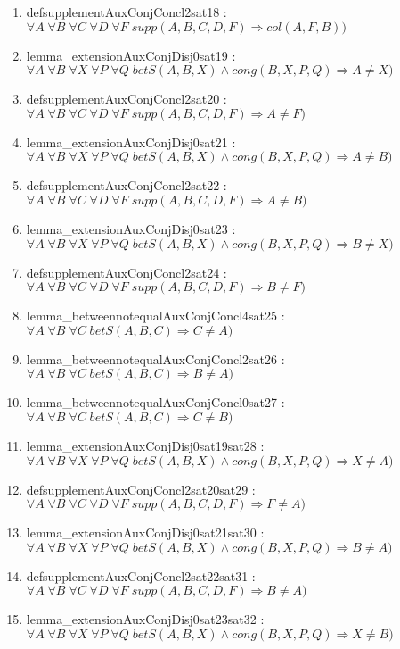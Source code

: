 \documentclass{article}
\begin{document}
\begin{enumerate}
\item defsupplementAuxConjConcl2sat18 : $\forall A\;\forall B\;\forall C\;\forall D\;\forall F\;supp(A, B, C, D, F) \Rightarrow col(A, F, B))$
\item lemma\_extensionAuxConjDisj0sat19 : $\forall A\;\forall B\;\forall X\;\forall P\;\forall Q\;betS(A, B, X)\wedge cong(B, X, P, Q) \Rightarrow A \neq X)$
\item defsupplementAuxConjConcl2sat20 : $\forall A\;\forall B\;\forall C\;\forall D\;\forall F\;supp(A, B, C, D, F) \Rightarrow A \neq F)$
\item lemma\_extensionAuxConjDisj0sat21 : $\forall A\;\forall B\;\forall X\;\forall P\;\forall Q\;betS(A, B, X)\wedge cong(B, X, P, Q) \Rightarrow A \neq B)$
\item defsupplementAuxConjConcl2sat22 : $\forall A\;\forall B\;\forall C\;\forall D\;\forall F\;supp(A, B, C, D, F) \Rightarrow A \neq B)$
\item lemma\_extensionAuxConjDisj0sat23 : $\forall A\;\forall B\;\forall X\;\forall P\;\forall Q\;betS(A, B, X)\wedge cong(B, X, P, Q) \Rightarrow B \neq X)$
\item defsupplementAuxConjConcl2sat24 : $\forall A\;\forall B\;\forall C\;\forall D\;\forall F\;supp(A, B, C, D, F) \Rightarrow B \neq F)$
\item lemma\_betweennotequalAuxConjConcl4sat25 : $\forall A\;\forall B\;\forall C\;betS(A, B, C) \Rightarrow C \neq A)$
\item lemma\_betweennotequalAuxConjConcl2sat26 : $\forall A\;\forall B\;\forall C\;betS(A, B, C) \Rightarrow B \neq A)$
\item lemma\_betweennotequalAuxConjConcl0sat27 : $\forall A\;\forall B\;\forall C\;betS(A, B, C) \Rightarrow C \neq B)$
\item lemma\_extensionAuxConjDisj0sat19sat28 : $\forall A\;\forall B\;\forall X\;\forall P\;\forall Q\;betS(A, B, X)\wedge cong(B, X, P, Q) \Rightarrow X \neq A)$
\item defsupplementAuxConjConcl2sat20sat29 : $\forall A\;\forall B\;\forall C\;\forall D\;\forall F\;supp(A, B, C, D, F) \Rightarrow F \neq A)$
\item lemma\_extensionAuxConjDisj0sat21sat30 : $\forall A\;\forall B\;\forall X\;\forall P\;\forall Q\;betS(A, B, X)\wedge cong(B, X, P, Q) \Rightarrow B \neq A)$
\item defsupplementAuxConjConcl2sat22sat31 : $\forall A\;\forall B\;\forall C\;\forall D\;\forall F\;supp(A, B, C, D, F) \Rightarrow B \neq A)$
\item lemma\_extensionAuxConjDisj0sat23sat32 : $\forall A\;\forall B\;\forall X\;\forall P\;\forall Q\;betS(A, B, X)\wedge cong(B, X, P, Q) \Rightarrow X \neq B)$

\end{enumerate}
\end{document}

